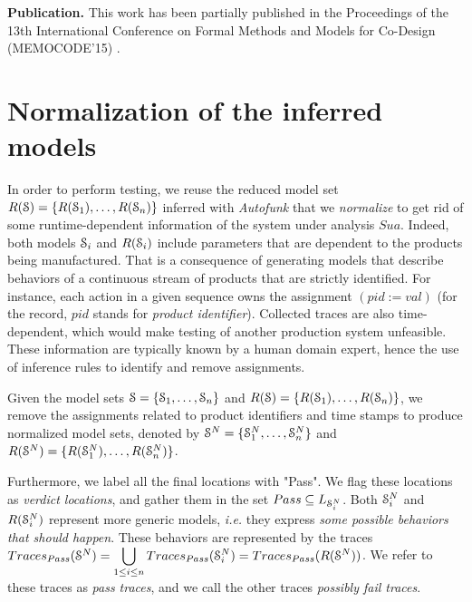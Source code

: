 \textbf{Publication.} This work has been partially published in
the Proceedings of the 13th International Conference on Formal
Methods and Models for Co-Design (MEMOCODE'15) \cite{7340480}.


\section{Normalization of the inferred models}
\label{sec:testing:normal}

In order to perform testing, we reuse the reduced model set
$R(\EuScript{S}) = \{R(\EuScript{S}_1),\dots,R(\EuScript{S}_n)\\
\}$ inferred with \textit{Autofunk} that we \textit{normalize} to
get rid of some runtime-dependent information of the system under
analysis $\mathit{Sua}$. Indeed, both models $\EuScript{S}_i$ and
$R(\EuScript{S}_i)$ include parameters that are dependent to the
products being manufactured. That is a consequence of generating
models that describe behaviors of a continuous stream of products
that are strictly identified. For instance, each action in a
given sequence owns the assignment $(pid := val)$ (for the
record, $pid$ stands for \emph{product identifier}). Collected
traces are also time-dependent, which would make testing of
another production system unfeasible. These information are
typically known by a human domain expert, hence the use of
inference rules to identify and remove assignments.

Given the model sets $\EuScript{S} =
\{\EuScript{S}_1,\dots,\EuScript{S}_n\}$ and $R(\EuScript{S}) =
\{R(\EuScript{S}_1),\dots,R(\EuScript{S}_n)\}$, we remove the
assignments related to product identifiers and time stamps to
produce normalized model sets, denoted by $\EuScript{S}^{N} = \{
\EuScript{S}_1^{N}, \dots, \EuScript{S}_n^{N} \}$ and
$R(\EuScript{S}^{N}) = \{ R(\EuScript{S}_1^{N}), \dots,
R(\EuScript{S}_n^{N}) \}$.

Furthermore, we label all the final locations with
"Pass". We flag these locations as \emph{verdict locations}, and
gather them in the set $Pass \subseteq L_{\EuScript{S}_i^{N}}$.
Both $\EuScript{S}_i^{N}$ and $R(\EuScript{S}_i^{N})$ represent more
generic models, \emph{i.e.}  they express \textit{some possible
behaviors that should happen}. These behaviors are represented by
the traces $Traces_{Pass} (\EuScript{S}^{N})=\displaystyle
\bigcup_{1 \leq i \leq n} Traces_{Pass}
(\EuScript{S}_i^{N})=Traces_{Pass} (R(\EuScript{S}^{N}))$. We
refer to these traces as \textit{pass traces}, and we call the
other traces \textit{possibly fail traces}.

